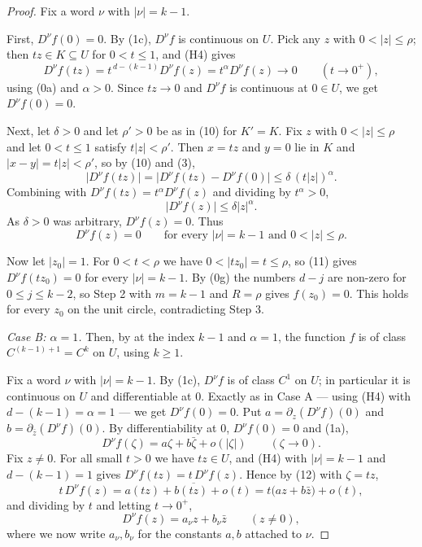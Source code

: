 \begin{proof}
Fix a word $\nu$ with $|\nu|=k-1$.

First, $D^\nu f(0)=0$.  By (1c), $D^\nu f$ is continuous on $U$.  Pick any $z$
with $0<|z|\le\rho$; then $tz\in K\subseteq U$ for $0<t\le1$, and (H4) gives
\[
  D^\nu f(tz)=t^{\,d-(k-1)}D^\nu f(z)=t^{\alpha}D^\nu f(z)\longrightarrow0
  \qquad(t\to0^+),
\]
using (0a) and $\alpha>0$.  Since $tz\to0$ and $D^\nu f$ is continuous at
$0\in U$, we get $D^\nu f(0)=0$.

Next, let $\delta>0$ and let $\rho'>0$ be as in (10) for $K'=K$.  Fix $z$ with
$0<|z|\le\rho$ and let $0<t\le1$ satisfy $t|z|<\rho'$.  Then $x=tz$ and $y=0$
lie in $K$ and $|x-y|=t|z|<\rho'$, so by (10) and (3),
\[
  \bigl|D^\nu f(tz)\bigr|=\bigl|D^\nu f(tz)-D^\nu f(0)\bigr|
  \le\delta\,(t|z|)^{\alpha}.
\]
Combining with $D^\nu f(tz)=t^{\alpha}D^\nu f(z)$ and dividing by
$t^{\alpha}>0$,
\[
  \bigl|D^\nu f(z)\bigr|\le\delta|z|^{\alpha}.
\]
As $\delta>0$ was arbitrary, $D^\nu f(z)=0$.  Thus
\begin{equation}\tag{11}
  D^\nu f(z)=0\qquad\text{for every }|\nu|=k-1\text{ and }0<|z|\le\rho .
\end{equation}

Now let $|z_0|=1$.  For $0<t<\rho$ we have $0<|tz_0|=t\le\rho$, so (11) gives
$D^\nu f(tz_0)=0$ for every $|\nu|=k-1$.  By (0g) the numbers $d-j$ are
non-zero for $0\le j\le k-2$, so Step 2 with $m=k-1$ and $R=\rho$ gives
$f(z_0)=0$.  This holds for every $z_0$ on the unit circle, contradicting
Step 3.

\noindent\emph{Case B: $\alpha=1$.}  Then, by  at the
index $k-1$ and $\alpha=1$, the function $f$ is of class $C^{(k-1)+1}=C^{k}$ on
$U$, using $k\ge1$.

Fix a word $\nu$ with $|\nu|=k-1$.  By (1c), $D^\nu f$ is of class $C^1$ on
$U$; in particular it is continuous on $U$ and differentiable at $0$.  Exactly
as in Case A --- using (H4) with $d-(k-1)=\alpha=1$ --- we get $D^\nu f(0)=0$.
Put $a=\partial_z(D^\nu f)(0)$ and $b=\partial_{\bar z}(D^\nu f)(0)$.  By
differentiability at $0$, $D^\nu f(0)=0$ and (1a),
\begin{equation}\tag{12}
  D^\nu f(\zeta)=a\zeta+b\bar\zeta+o(|\zeta|)\qquad(\zeta\to0).
\end{equation}
Fix $z\neq0$.  For all small $t>0$ we have $tz\in U$, and (H4) with
$|\nu|=k-1$ and $d-(k-1)=1$ gives $D^\nu f(tz)=t\,D^\nu f(z)$.  Hence by (12)
with $\zeta=tz$,
\[
  t\,D^\nu f(z)=a(tz)+b\overline{(tz)}+o(t)=t\bigl(az+b\bar z\bigr)+o(t) ,
\]
and dividing by $t$ and letting $t\to0^+$,
\begin{equation}\tag{13}
  D^\nu f(z)=a_\nu z+b_\nu\bar z\qquad(z\neq0),
\end{equation}
where we now write $a_\nu,b_\nu$ for the constants $a,b$ attached to $\nu$.


\end{proof}

